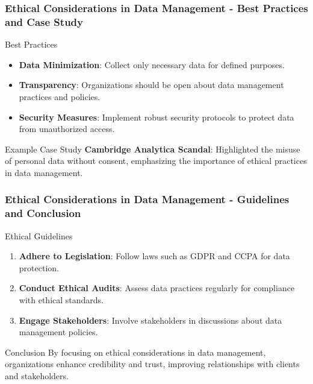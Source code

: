 \documentclass[aspectratio=169]{beamer}
\begin{document}
\begin{frame}[fragile]
    \frametitle{Ethical Considerations in Data Management - Best Practices and Case Study}
    \begin{block}{Best Practices}
        \begin{itemize}
            \item \textbf{Data Minimization}: Collect only necessary data for defined purposes.
            \item \textbf{Transparency}: Organizations should be open about data management practices and policies.
            \item \textbf{Security Measures}: Implement robust security protocols to protect data from unauthorized access.
        \end{itemize}
    \end{block}

    \begin{block}{Example Case Study}
        \textbf{Cambridge Analytica Scandal}: Highlighted the misuse of personal data without consent, emphasizing the importance of ethical practices in data management.
    \end{block}
\end{frame}

\begin{frame}[fragile]
    \frametitle{Ethical Considerations in Data Management - Guidelines and Conclusion}
    \begin{block}{Ethical Guidelines}
        \begin{enumerate}
            \item \textbf{Adhere to Legislation}: Follow laws such as GDPR and CCPA for data protection.
            \item \textbf{Conduct Ethical Audits}: Assess data practices regularly for compliance with ethical standards.
            \item \textbf{Engage Stakeholders}: Involve stakeholders in discussions about data management policies.
        \end{enumerate}
    \end{block}

    \begin{block}{Conclusion}
        By focusing on ethical considerations in data management, organizations enhance credibility and trust, improving relationships with clients and stakeholders.
    \end{block}
\end{frame}
\end{document}
